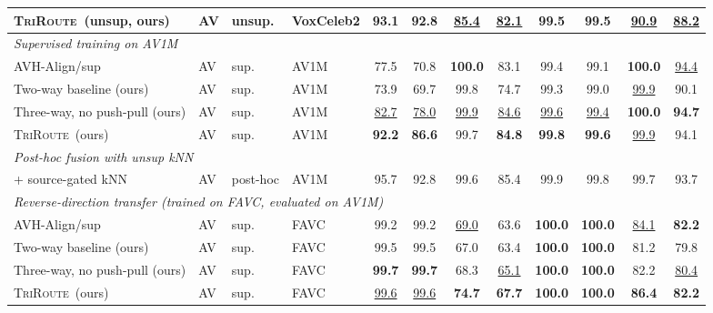 \documentclass{article}
\newcommand{\method}{\textsc{TriRoute}}
\begin{document}
\begin{table}[t]
{\begin{tabular}{llllcccccccc}
        \method\ (unsup, ours)                  & AV & unsup. & VoxCeleb2 & 93.1 & 92.8 & \underline{85.4} & \underline{82.1} & 99.5 & 99.5 & \underline{90.9} & \underline{88.2} \\
        \midrule
        \multicolumn{12}{l}{\emph{Supervised training on AV1M}} \\
        AVH-Align/sup \citep{smeu2025avhalign} & AV & sup. & AV1M & 77.5 & 70.8 & \textbf{100.0} & 83.1 & 99.4 & 99.1 & \textbf{100.0} & \underline{94.4} \\
        Two-way baseline (ours)          & AV & sup. & AV1M & 73.9 & 69.7 & 99.8 & 74.7 & 99.3 & 99.0 & \underline{99.9} & 90.1 \\
        Three-way, no push-pull (ours)   & AV & sup. & AV1M & \underline{82.7} & \underline{78.0} & \underline{99.9} & \underline{84.6} & \underline{99.6} & \underline{99.4} & \textbf{100.0} & \textbf{94.7} \\
        \method\ (ours)                  & AV & sup. & AV1M & \textbf{92.2} & \textbf{86.6} & 99.7 & \textbf{84.8} & \textbf{99.8} & \textbf{99.6} & \underline{99.9} & 94.1 \\
        \midrule
        \multicolumn{12}{l}{\emph{Post-hoc fusion with unsup kNN}} \\
        \quad + source-gated kNN                & AV & post-hoc & AV1M & 95.7 & 92.8 & 99.6 & 85.4 & 99.9 & 99.8 & 99.7 & 93.7 \\
        \midrule
        \multicolumn{12}{l}{\emph{Reverse-direction transfer (trained on FAVC, evaluated on AV1M)}} \\
        AVH-Align/sup \citep{smeu2025avhalign} & AV & sup. & FAVC & 99.2 & 99.2 & \underline{69.0} & 63.6 & \textbf{100.0} & \textbf{100.0} & \underline{84.1} & \textbf{82.2} \\
        Two-way baseline (ours)          & AV & sup. & FAVC & 99.5 & 99.5 & 67.0 & 63.4 & \textbf{100.0} & \textbf{100.0} & 81.2 & 79.8 \\
        Three-way, no push-pull (ours)   & AV & sup. & FAVC & \textbf{99.7} & \textbf{99.7} & 68.3 & \underline{65.1} & \textbf{100.0} & \textbf{100.0} & 82.2 & \underline{80.4} \\
        \method\ (ours)                  & AV & sup. & FAVC & \underline{99.6} & \underline{99.6} & \textbf{74.7} & \textbf{67.7} & \textbf{100.0} & \textbf{100.0} & \textbf{86.4} & \textbf{82.2} \\
        \bottomrule
    \end{tabular}}
\end{table}
\end{document}

